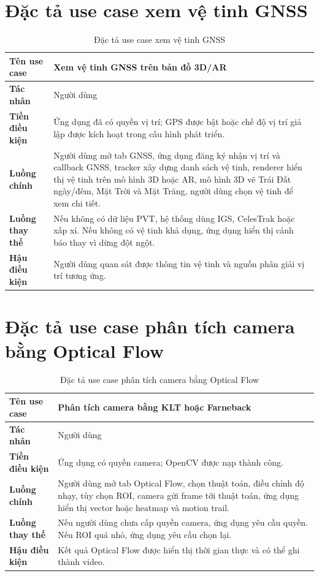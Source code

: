 \documentclass[../DoAn.tex]{subfiles}
\begin{document}
\section{Đặc tả use case xem vệ tinh GNSS}
\begin{table}[H]
\centering
\begin{tabular}{|p{4cm}|p{9cm}|}
\hline
\textbf{Tên use case} & Xem vệ tinh GNSS trên bản đồ 3D/AR \\ \hline
\textbf{Tác nhân} & Người dùng \\ \hline
\textbf{Tiền điều kiện} & Ứng dụng đã có quyền vị trí; GPS được bật hoặc chế độ vị trí giả lập được kích hoạt trong cấu hình phát triển. \\ \hline
\textbf{Luồng chính} & Người dùng mở tab GNSS, ứng dụng đăng ký nhận vị trí và callback GNSS, tracker xây dựng danh sách vệ tinh, renderer hiển thị vệ tinh trên mô hình 3D hoặc AR, mô hình 3D vẽ Trái Đất ngày/đêm, Mặt Trời và Mặt Trăng, người dùng chọn vệ tinh để xem chi tiết. \\ \hline
\textbf{Luồng thay thế} & Nếu không có dữ liệu PVT, hệ thống dùng IGS, CelesTrak hoặc xấp xỉ. Nếu không có vệ tinh khả dụng, ứng dụng hiển thị cảnh báo thay vì dừng đột ngột. \\ \hline
\textbf{Hậu điều kiện} & Người dùng quan sát được thông tin vệ tinh và nguồn phân giải vị trí tương ứng. \\ \hline
\end{tabular}
\caption{Đặc tả use case xem vệ tinh GNSS}
\end{table}

\section{Đặc tả use case phân tích camera bằng Optical Flow}
\begin{table}[H]
\centering
\begin{tabular}{|p{4cm}|p{9cm}|}
\hline
\textbf{Tên use case} & Phân tích camera bằng KLT hoặc Farneback \\ \hline
\textbf{Tác nhân} & Người dùng \\ \hline
\textbf{Tiền điều kiện} & Ứng dụng có quyền camera; OpenCV được nạp thành công. \\ \hline
\textbf{Luồng chính} & Người dùng mở tab Optical Flow, chọn thuật toán, điều chỉnh độ nhạy, tùy chọn ROI, camera gửi frame tới thuật toán, ứng dụng hiển thị vector hoặc heatmap và motion trail. \\ \hline
\textbf{Luồng thay thế} & Nếu người dùng chưa cấp quyền camera, ứng dụng yêu cầu quyền. Nếu ROI quá nhỏ, ứng dụng yêu cầu chọn lại. \\ \hline
\textbf{Hậu điều kiện} & Kết quả Optical Flow được hiển thị thời gian thực và có thể ghi thành video. \\ \hline
\end{tabular}
\caption{Đặc tả use case phân tích camera bằng Optical Flow}
\end{table}
\end{document}
